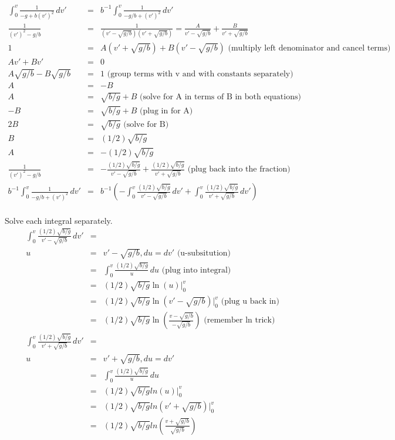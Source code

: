 \documentclass[11pt]{amsart}
\begin{document}
\begin{eqnarray*}
\int^{v}_{0}\frac{1}{-g+b(v')^{2}}\,dv' &=& b^{-1}\int^{v}_{0}\frac{1}{-g/b+(v')^{2}}\,dv' \\
\frac{1}{(v')^{2} -g/b} &=& \frac{1}{(v'-\sqrt{g/b})(v'+\sqrt{g/b})} = \frac{A}{v'-\sqrt{g/b}}+\frac{B}{v'+\sqrt{g/b}} \\ 
1 &=& A(v'+\sqrt{g/b}) + B(v'-\sqrt{g/b}) \mbox{ (multiply left denominator and cancel terms)} \\
Av' + Bv' &=& 0 \\
A\sqrt{g/b}-B\sqrt{g/b} &=& 1 \mbox{ (group terms with v and with constants separately)} \\
A &=& -B \\
A &=& \sqrt{b/g}+B \mbox{ (solve for A in terms of B in both equations)} \\
-B &=& \sqrt{b/g} +B  \mbox{ (plug in for A)} \\
2B &=& \sqrt{b/g} \mbox{ (solve for B)} \\
B &=& (1/2)\sqrt{b/g} \\
A &=& -(1/2)\sqrt{b/g} \\
\frac{1}{(v')^{2}-g/b} &=& -\frac{(1/2)\sqrt{b/g}}{v'-\sqrt{g/b}} + \frac{(1/2)\sqrt{b/g}}{v' + \sqrt{g/b}} \mbox{ (plug back into the fraction)} \\
b^{-1}\int^{v}_{0}\frac{1}{-g/b+(v')^{2}}\,dv' &=& b^{-1}(-\int^{v}_{0}\frac{(1/2)\sqrt{b/g}}{v'-\sqrt{g/b}}\,dv' + \int^{v}_{0}\frac{(1/2)\sqrt{b/g}}{v'+\sqrt{g/b}}\,dv') 
\end{eqnarray*} \\
Solve each integral separately. \\ 
\begin{eqnarray*} 
\int^{v}_{0}\frac{(1/2)\sqrt{b/g}}{v'-\sqrt{g/b}}\,dv' &=&  \\
u &=& v'-\sqrt{g/b}, du = dv' \mbox{ (u-subsitution)} \\
&=& \int^{v}_{0}\frac{(1/2)\sqrt{b/g}}{u}\,du \mbox{ (plug into integral)} \\
&=& (1/2)\sqrt{b/g}\ln(u)|^{v}_{0} \\
&=& (1/2)\sqrt{b/g}\ln(v'-\sqrt{g/b})|^{v}_{0} \mbox{ (plug u back in)} \\
&=& (1/2)\sqrt{b/g}\ln(\frac{v-\sqrt{g/b}}{-\sqrt{g/b}}) \mbox{ (remember ln trick)} \\
\int^{v}_{0}\frac{(1/2)\sqrt{b/g}}{v'+\sqrt{g/b}}\,dv' &=&  \\
u &=& v' +\sqrt{g/b}, du = dv' \\
&=& \int^{v}_{0}\frac{(1/2)\sqrt{b/g}}{u}\,du \\
&=& (1/2)\sqrt{b/g}ln(u)|^{v}_{0} \\
&=& (1/2)\sqrt{b/g}ln(v' +\sqrt{g/b})|^{v}_{0} \\
&=& (1/2)\sqrt{b/g}ln(\frac{v +\sqrt{g/b}}{\sqrt{g/b}})  
\end{eqnarray*} \\ 
\end{document}
